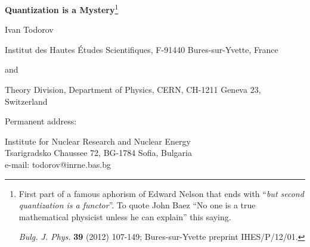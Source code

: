 \documentclass[12pt]{article}
\begin{document}
\def\vac{| 0 \rangle}
\def\leftvac{\langle 0 |}
\def\C{\mathbb C}
\def\R{\mathbb R}
\def\S{\mathbb S}

\begin{center}

{\Large {\bf Quantization is a Mystery}}\footnote{First part of a famous
aphorism of Edward Nelson that ends with ``{\it but second quantization is a
functor}''. To quote John Baez \cite{B06} ``No one is a true mathematical
physicist unless he can explain'' this saying.

{\it Bulg. J. Phys.} {\bf 39} (2012) 107-149;
Bures-sur-Yvette preprint IHES/P/12/01.}

\vspace{4mm}

Ivan Todorov

Institut des Hautes \'Etudes Scientifiques, F-91440 Bures-sur-Yvette, France

and

Theory Division, Department of Physics, CERN, CH-1211 Geneva 23, Switzerland

Permanent address:
 
Institute for Nuclear Research and Nuclear Energy\\
Tsarigradsko Chaussee 72, BG-1784 Sofia, Bulgaria\\
e-mail: todorov@inrne.bas.bg 

\end{center}

\begin{abstract}

Expository notes which combine a historical survey of the development of quantum physics with a review of selected mathematical topics in quantization theory (addressed to students that are not complete novices in quantum mechanics).

After recalling in the introduction the early stages of the quantum revolution, and recapitulating 
in Sect. 2.1 some basic notions of symplectic geometry, we survey in Sect. 2.2 the 
so called {\it prequantization} thus preparing the ground for an outline of 
{\it geometric quantization} (Sect. 2.3). In Sect. 3 we apply the general theory
to the study of basic examples of {\it quantization of K\"ahler manifolds}. In Sect. 4 we review the Weyl and Wigner maps and the work of Groenewold and Moyal that laid the foundations of {\it quantum mechanics in phase space}, ending with a brief survey of the modern development of {\it deformation quantization}. Sect. 5
provides a review of {\it second quantization} and its mathematical interpretation. We point out that the treatment of (nonrelativistic) bound states requires going beyond the neat mathematical formalization of the concept of second quantization. An appendix is devoted to Pascual Jordan, the least known among the creators of  quantum mechanics and  the chief architect of the ``theory of quantized matter waves''.
\end{abstract}
\end{document}
